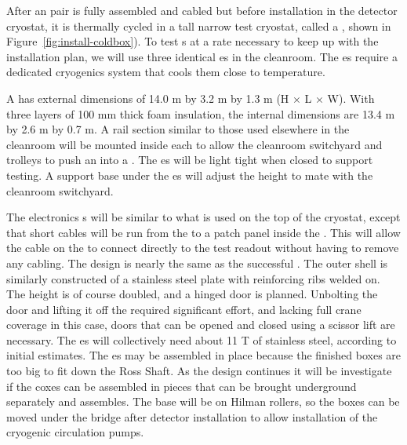 After an  pair is fully assembled and cabled but before installation in the detector cryostat, it is thermally cycled in a tall narrow test cryostat, called a \coldbox{}, shown in Figure~\ref{fig:install-coldbox}). 
To test s at a rate necessary to keep up with the installation plan, we will use three identical \coldbox{}es in the cleanroom. 
The \coldbox{}es require a dedicated cryogenics system that cools them  close to  temperature. 


A \coldbox has external dimensions of 14.0 \si{m} by 3.2 \si{m} by 1.3 \si{m} (H $\times$ L $\times$ W). With three layers of 100 \si{mm} thick foam insulation,  
the internal dimensions are 13.4 \si{m} by 2.6 \si{m} by 0.7 \si{m}. A rail section similar to those used elsewhere in the cleanroom will be mounted inside each \coldbox to allow the cleanroom switchyard and trolleys to push an    into a \coldbox. The \coldbox{}es will be light tight when closed to support  testing. A support base under the \coldbox{}es will adjust the height to mate with the cleanroom switchyard.

 
The \coldbox electronics \fdth{}s  will be  similar to what is used on the top of the  cryostat, except that short cables will be run from the   to a patch panel inside the \coldbox. This will allow the cable on the  to connect directly to the test readout without having to remove any cabling. The \coldbox  design is nearly the same as the successful  \coldbox. The outer shell is similarly constructed of a stainless steel plate with reinforcing ribs welded on. The height is of course doubled, and a hinged door is planned. Unbolting the door and lifting it off the  \coldbox required significant effort, and lacking full crane coverage in this case, doors that can be opened and closed using a scissor lift are necessary. The  \coldbox{}es will collectively need about 11 \si{T} of stainless steel, according to initial estimates. The \coldbox{}es may be assembled in place because the finished boxes are too big to fit down the Ross Shaft. As the design continues it will be investigate if the coxes can be assembled in pieces that can be brought underground separately and assembles. The \coldbox base will be on Hilman rollers, so the boxes can be moved under the bridge after detector installation  to allow installation of the cryogenic circulation pumps.




